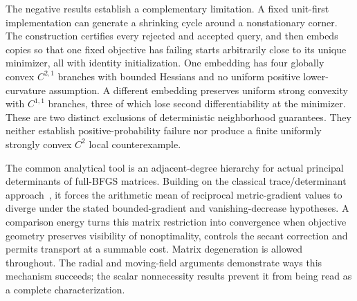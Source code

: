 The negative results establish a complementary limitation. A fixed unit-first
implementation can generate a shrinking cycle around a nonstationary corner.
The construction certifies every rejected and accepted query, and then embeds
copies so that one fixed objective has failing starts arbitrarily close to
its unique minimizer, all with identity initialization. One embedding has
four globally convex $C^{2,1}$ branches with bounded Hessians and no uniform
positive lower-curvature assumption. A different embedding preserves uniform
strong convexity with $C^{1,1}$ branches, three of which lose second differentiability at
the minimizer. These are two distinct exclusions of deterministic
neighborhood guarantees. They neither establish positive-probability failure
nor produce a finite uniformly strongly convex $C^2$ local counterexample.

The common analytical tool is an adjacent-degree hierarchy for actual
principal determinants of full-BFGS matrices. Building on the classical
trace/determinant approach~\cite{FND_P76,FND_BN89,FND_N92}, it forces the
arithmetic mean of reciprocal metric-gradient values to diverge under the
stated bounded-gradient and vanishing-decrease hypotheses. A comparison
energy turns this matrix restriction into convergence when objective
geometry preserves visibility of nonoptimality, controls the secant
correction and permits transport at a summable cost. Matrix degeneration
is allowed throughout. The radial and moving-field arguments demonstrate
ways this mechanism succeeds; the scalar nonnecessity results prevent it
from being read as a complete characterization.
